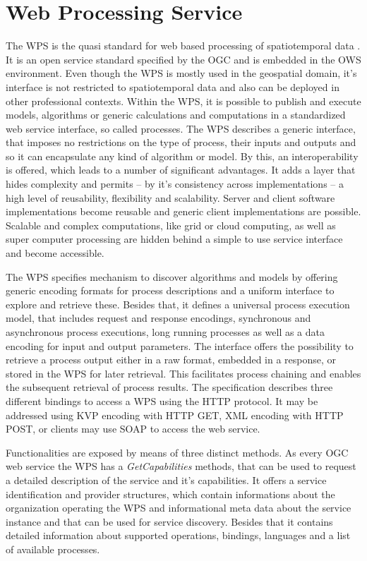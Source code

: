 \chapter{Web Processing Service}
	\label{sec:wps}
	The \ac{WPS} \citep{ogc:wps} is the quasi standard for web based processing of spatiotemporal data \citep{foerster2012live}. It is an open service standard specified by the \ac{OGC} and is embedded in the \ac{OWS} environment. Even though the \ac{WPS} is mostly used in the geospatial domain, it's interface is not restricted to spatiotemporal data and also can be deployed in other professional contexts. Within the WPS, it is possible to publish and execute models, algorithms or generic calculations and computations in a standardized web service interface, so called processes. The \ac{WPS} describes a generic interface, that imposes no restrictions on the type of process, their inputs and outputs and so it can encapsulate any kind of algorithm or model. By this, an interoperability is offered, which leads to a number of significant advantages. It adds a layer that hides complexity and permits -- by it's consistency across implementations -- a high level of reusability, flexibility and scalability. Server and client software implementations become reusable and generic client implementations are possible. Scalable and complex computations, like grid or cloud computing, as well as super computer processing are hidden behind a simple to use service interface and become accessible.

	The \ac{WPS} specifies mechanism to discover algorithms and models by offering generic encoding formats for process descriptions and a uniform interface to explore and retrieve these. Besides that, it defines a universal process execution model, that includes request and response encodings, synchronous and asynchronous process executions, long running processes as well as a data encoding for input and output parameters. The interface offers the possibility to retrieve a process output either in a raw format, embedded in a response, or stored in the \ac{WPS} for later retrieval. This facilitates process chaining and enables the subsequent retrieval of process results. The specification describes three different bindings to access a \ac{WPS} using the HTTP protocol. It may be addressed using \ac{KVP} encoding with HTTP GET, XML encoding with HTTP POST, or clients may use SOAP \citep{w3c:soap1} to access the web service.

	Functionalities are exposed by means of three distinct methods. As every \ac{OGC} web service the \ac{WPS} has a \emph{GetCapabilities} methods, that can be used to request a detailed description of the service and it's capabilities. It offers a service identification and provider structures, which contain informations about the organization operating the \ac{WPS} and informational meta data about the service instance and that can be used for service discovery. Besides that it contains detailed information about supported operations, bindings, languages and a list of available processes.

